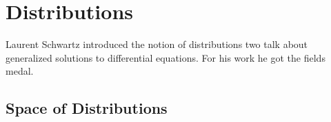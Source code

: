 
%
%
%
%

\chapter{Distributions}
Laurent Schwartz introduced the notion of distributions two talk about generalized solutions to differential equations. For his work he got the fields medal.

\section{Space of Distributions}

